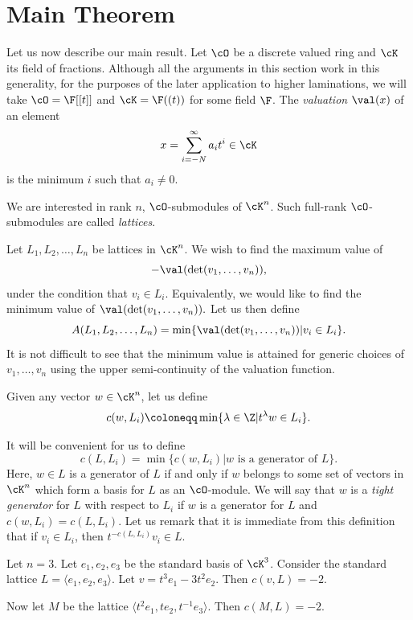 \section{Main Theorem}\label{sect4}

Let us now describe our main result. Let $\cO$ be a discrete valued ring and $\cK$ its field of fractions. Although all the arguments in this section work in this generality, for the purposes of the later application to higher laminations, we will take $\cO=\F[[t]]$ and $\cK=\F((t))$ for some field $\F$. The \emph{valuation} $\val(x)$ of an element 
\[
x = \sum_{i=-N}^{\infty} a_i t^i \in \cK
\]
 is the minimum $i$ such that $a_i \neq 0$. 

We are interested in rank $n$, $\cO$-submodules of $\cK^n$. Such full-rank $\cO$-submodules are called {\it lattices}.

Let $L_1, L_2, \dots, L_n$ be lattices in $\cK^n$. We wish to find the maximum value of
\[
-\val(\det(v_1, \dots, v_n)),
\]
under the condition that $v_i \in L_i$. Equivalently, we would like to find the minimum value of $\val(\det(v_1, \dots, v_n)).$ Let us then define 
\[
A(L_1, L_2, \dots, L_n) = \min \{\val(\det(v_1, \dots, v_n)) | v_i \in L_i\}.
\]
It is not difficult to see that the minimum value is attained for generic choices of $v_1, \dots, v_n$ using the upper semi-continuity of the valuation function.

Given any vector $w \in \cK^n$, let us define 
\[
c(w,L_i) \coloneqq  \min\{\lambda \in \Z | t^{\lambda}w \in L_i \}.
\]

It will be convenient for us to define
\[
c(L,L_i) = \min \{ c(w,L_i) | w \text{ is a generator of } L \}.
\]
Here, $w \in L$ is a generator of $L$ if and only if $w$ belongs to some set of vectors in $\cK^n$ which form a basis for $L$ as an $\cO$-module. We will say that $w$ is a \emph{tight generator} for $L$ with respect to $L_i$ if $w$ is a generator for $L$ and $c(w,L_i)=c(L,L_i)$. Let us remark that it is immediate from this definition that if $v_i \in L_i$, then $t^{-c(L,L_i)}v_i \in L$.

\begin{example} Let $n=3$. Let $e_1, e_2, e_3$ be the standard basis of $\cK^3$. Consider the standard lattice $L= \langle e_1, e_2, e_3\rangle .$ Let $v=t^3e_1 -3t^2 e_2$. Then $c(v, L)= -2$.

Now let $M$ be the lattice $\langle t^2e_1, te_2, t^{-1}e_3\rangle $. Then $c(M,L) = -2$.

\end{example}

